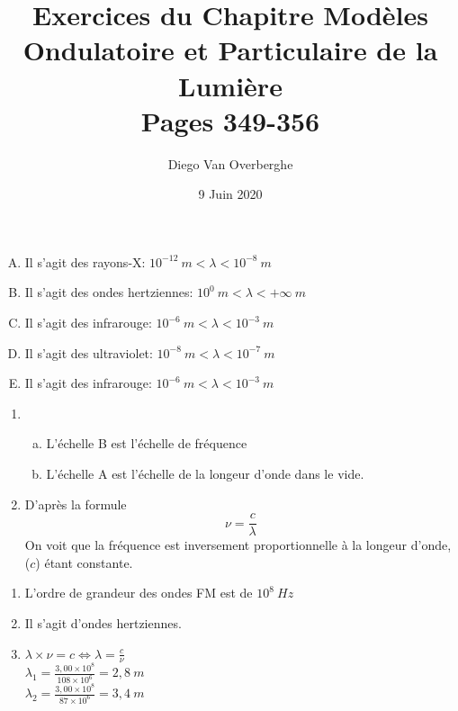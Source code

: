\documentclass[12pt, a4paper]{article}
\begin{document}
    \title{Exercices du Chapitre Modèles Ondulatoire et Particulaire de la Lumière \\ \Large{Pages 349-356}}
    \author{Diego Van Overberghe}
    \date{9 Juin 2020}
    \maketitle

    \begin{Exercise}[number={9}]
        \begin{enumerate}[A.]
            \item	Il s'agit des rayons-X: $10^{-12}\ \si{m}<\lambda<10^{-8}\ \si{m}$
            \item   Il s'agit des ondes hertziennes: $10^0\ \si{m}<\lambda<+\infty\ \si{m}$
            \item   Il s'agit des infrarouge: $10^{-6}\ \si{m}<\lambda<10^{-3}\ \si{m}$
            \item   Il s'agit des ultraviolet: $10^{-8}\ \si{m}<\lambda<10^{-7}\ \si{m}$
            \item   Il s'agit des infrarouge: $10^{-6}\ \si{m}<\lambda<10^{-3}\ \si{m}$
        \end{enumerate}
    \end{Exercise}

    \begin{Exercise}[number={11}]
        \begin{enumerate}[1.]
            \item	\begin{enumerate}[a.]
                        \item	L'échelle { \large\textcircled{\small{B}} } est l'échelle de fréquence
                        \item   L'échelle { \large\textcircled{\small{A}} } est l'échelle de la longeur d'onde dans le vide.
                    \end{enumerate}
            \item   D'après la formule 
                    \begin{equation*}
                        \nu=\frac{c}{\lambda}
                    \end{equation*} On voit que la fréquence est inversement proportionnelle à la longeur d'onde, ($c$) étant constante.
        \end{enumerate}
    \end{Exercise}

    \begin{Exercise}[number={15}]
        \begin{enumerate}[1.]
            \item	L'ordre de grandeur des ondes FM est de $10^8\ \si{Hz}$
            \item   Il s'agit d'ondes hertziennes.
            \item   $\lambda\times\nu=c\iff\lambda=\frac{c}{\nu}$ \\ $\lambda_1=\frac{3{,}00\times 10^8}{108\times 10^6}=2{,}8\ \si{m}$ \\ $\lambda_2=\frac{3{,}00\times 10^8}{87\times 10^6}=3{,}4\ \si{m}$
        \end{enumerate}
    \end{Exercise}
\end{document}
